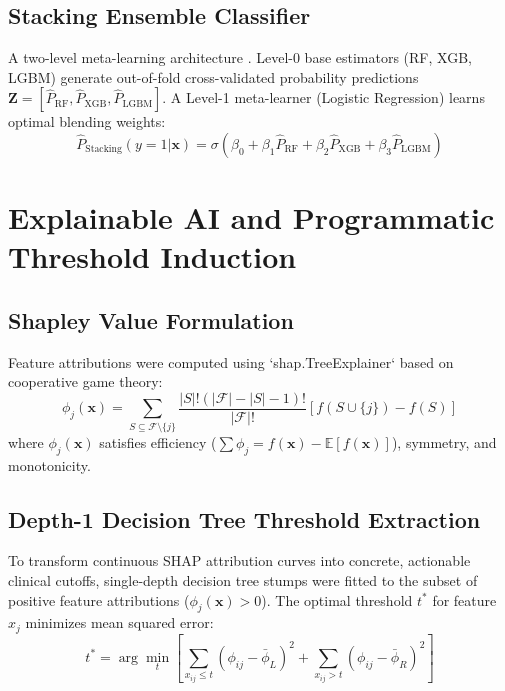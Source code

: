 \documentclass[12pt, a4paper]{report}
\begin{document}
\subsection{Stacking Ensemble Classifier}
A two-level meta-learning architecture \cite{wolpert1992}. Level-0 base estimators (RF, XGB, LGBM) generate out-of-fold cross-validated probability predictions $\mathbf{Z} = [\hat{P}_{\text{RF}}, \hat{P}_{\text{XGB}}, \hat{P}_{\text{LGBM}}]$. A Level-1 meta-learner (Logistic Regression) learns optimal blending weights:
\begin{equation}
\hat{P}_{\text{Stacking}}(y=1|\mathbf{x}) = \sigma(\beta_0 + \beta_1 \hat{P}_{\text{RF}} + \beta_2 \hat{P}_{\text{XGB}} + \beta_3 \hat{P}_{\text{LGBM}})
\end{equation}

\section{Explainable AI and Programmatic Threshold Induction}
\subsection{Shapley Value Formulation}
Feature attributions were computed using `shap.TreeExplainer` \cite{lundberg2017} based on cooperative game theory:
\begin{equation}
\phi_j(\mathbf{x}) = \sum_{S \subseteq \mathcal{F} \setminus \{j\}} \frac{|S|! (|\mathcal{F}| - |S| - 1)!}{|\mathcal{F}|!} \left[ f(S \cup \{j\}) - f(S) \right]
\end{equation}
where $\phi_j(\mathbf{x})$ satisfies efficiency ($\sum \phi_j = f(\mathbf{x}) - \mathbb{E}[f(\mathbf{x})]$), symmetry, and monotonicity.

\subsection{Depth-1 Decision Tree Threshold Extraction}
To transform continuous SHAP attribution curves into concrete, actionable clinical cutoffs, single-depth decision tree stumps were fitted to the subset of positive feature attributions ($\phi_j(\mathbf{x}) > 0$). The optimal threshold $t^*$ for feature $x_j$ minimizes mean squared error:
\begin{equation}
t^* = \arg\min_t \left[ \sum_{x_{ij} \le t} (\phi_{ij} - \bar{\phi}_L)^2 + \sum_{x_{ij} > t} (\phi_{ij} - \bar{\phi}_R)^2 \right]
\end{equation}
\end{document}
